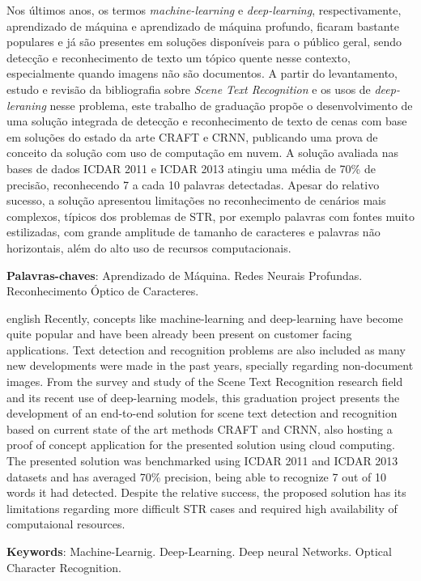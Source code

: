 
\setlength{\absparsep}{18pt} %
\begin{resumo}
Nos últimos anos, os termos \textit{machine-learning} e \textit{deep-learning}, respectivamente, aprendizado de máquina e aprendizado de máquina profundo, ficaram bastante populares e já são presentes em soluções disponíveis para o público geral, sendo detecção e reconhecimento de texto um tópico quente nesse contexto, especialmente quando imagens não são documentos.
A partir do levantamento, estudo e revisão da bibliografia sobre \textit{Scene Text Recognition} e os usos de \textit{deep-leraning} nesse problema, este trabalho de graduação propõe o desenvolvimento de uma solução integrada de detecção e reconhecimento de texto de cenas com base em soluções do estado da arte CRAFT e CRNN, publicando uma prova de conceito da solução com uso de computação em nuvem.
A solução avaliada nas bases de dados ICDAR 2011 e ICDAR 2013 atingiu uma média de 70\% de precisão, reconhecendo 7 a cada 10 palavras detectadas. Apesar do relativo sucesso, a solução apresentou limitações no reconhecimento de cenários mais complexos, típicos dos problemas de STR, por exemplo palavras com fontes muito estilizadas, com grande amplitude de tamanho de caracteres e palavras não horizontais, além do alto uso de recursos computacionais.

 \textbf{Palavras-chaves}: Aprendizado de Máquina. Redes Neurais Profundas. Reconhecimento Óptico de Caracteres.
\end{resumo}

\begin{resumo}[Abstract]
 \begin{otherlanguage*}{english}
   Recently, concepts like machine-learning and deep-learning have become quite popular and have been already been present on customer facing applications. Text detection and recognition problems are also included as many new developments were made in the past years, specially regarding non-document images.
   From the survey and study of the Scene Text Recognition research field and its recent use of deep-learning models, this graduation project presents the development of an end-to-end solution for scene text detection and recognition based on current state of the art methods CRAFT and CRNN, also hosting a proof of concept application for the presented solution using cloud computing. 
   The presented solution was benchmarked using ICDAR 2011 and ICDAR 2013 datasets and has averaged 70\% precision, being able to recognize 7 out of 10 words it had detected. Despite the relative success, the proposed solution has its limitations regarding more difficult STR cases and required high availability of computaional resources.

   \vspace{\onelineskip}
 
   \noindent 
   \textbf{Keywords}: Machine-Learnig. Deep-Learning. Deep neural Networks. Optical Character Recognition.
 \end{otherlanguage*}
\end{resumo}